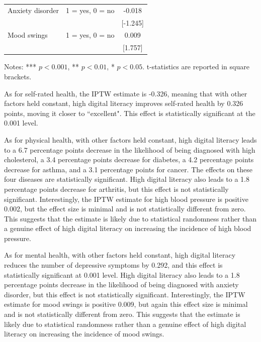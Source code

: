 \begin{table}[h!]
\begin{threeparttable}
\begin{tabular}{llc}
            Anxiety disorder & 1 = yes, 0 = no  & -0.018 \\
            &  & [-1.245] \\
            Mood swings & 1 = yes, 0 = no  & 0.009 \\
            &  & [1.757] \\
            \bottomrule
        \end{tabular}
        \begin{tablenotes}
            \footnotesize
            \item Notes: *** $p < 0.001$, ** $p < 0.01$, * $p < 0.05$. t-statistics are reported in square brackets.
        \end{tablenotes}
    \end{threeparttable}
\end{table}

As for self-rated health, the IPTW estimate is -0.326, meaning that with other factors held constant, high digital literacy improves self-rated health by 0.326 points, moving it closer to ``excellent". This effect is statistically significant at the 0.001 level.

As for physical health, with other factors held constant, high digital literacy leads to a 6.7 percentage points decrease in the likelihood of being diagnosed with high cholesterol, a 3.4 percentage points decrease for diabetes, a 4.2 percentage points decrease for asthma, and a 3.1 percentage points for cancer. The effects on these four diseases are statistically significant. High digital literacy also leads to a 1.8 percentage points decrease for arthritis, but this effect is not statistically significant. Interestingly, the IPTW estimate for high blood pressure is positive 0.002, but the effect size is minimal and is not statistically different from zero. This suggests that the estimate is likely due to statistical randomness rather than a genuine effect of high digital literacy on increasing the incidence of high blood pressure.

As for mental health, with other factors held constant, high digital literacy reduces the number of depressive symptoms by 0.292, and this effect is statistically significant at 0.001 level. High digital literacy also leads to a 1.8 percentage points decrease in the likelihood of being diagnosed with anxiety disorder, but this effect is not statistically significant. Interestingly, the IPTW estimate for mood swings is positive 0.009, but again this effect size is minimal and is not statistically different from zero. This suggests that the estimate is likely due to statistical randomness rather than a genuine effect of high digital literacy on increasing the incidence of mood swings.

